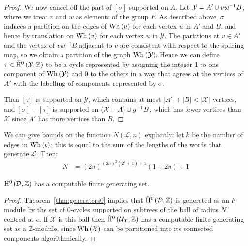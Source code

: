 \begin{proof}
We now cancel off the part of $\left[\sigma\right]$ supported on $A$.  Let
$\mathcal{Y} = A' \cup vw^{-1} B$, where we treat $v$ and $w$ as
elements of the group $F$. As described above, $\sigma$ induces a partition
on the edges of $\mathrm{Wh}\left(u\right)$ for each vertex $u$ in $A'$ and $B$, and hence
by translation on $\mathrm{Wh}\left(u\right)$ for each vertex $u$ in $\mathcal{Y}$. The
partitions at $v \in A'$ and the vertex of $vw^{-1}B$ adjacent to $v$ are
consistent with respect to the splicing map, so we obtain a partition of the
graph $\mathrm{Wh}\left(\mathcal{Y}\right)$. Hence we can define $\tau \in
\check{\mathrm{H}}^{0}\left(\mathcal{Y}, \mathbb{Z}\right)$ to be a cycle represented by
assigning the integer 1 to one component of $\mathrm{Wh}\left(\mathcal{Y}\right)$ and 0 to the
others in a way that agrees at the vertices of $A'$ with the labelling of
components represented by $\sigma$.

Then $\left[\tau\right]$ is supported on $\mathcal{Y}$, which contains at
most $\left|A'\right| + \left|B\right| < \left|\mathcal{X}\right|$ vertices,
and $\left[\sigma\right]-\left[\tau\right]$ is supported on $\left(
\mathcal{X} - A\right) \cup g^{-1}B$, which has fewer vertices than
$\mathcal{X}$ since $A'$ has more vertices than $B$. \end{proof}

\begin{rem} We can give bounds on the function $N\left(\mathcal{L}, n\right)$
explicitly: let $k$ be the number of edges in $\mathrm{Wh}\left(e\right)$; this is equal to
the sum of the lengths of the words that generate $\mathcal{L}$. Then:
\begin{align}
N &= \left(2n\right)^{\left(2n\right)^2\left(2^k+1\right)+1}\left(1+2n\right)+1
\end{align}
\end{rem}

\begin{cor} $\check{\mathrm{H}}{}^0\left(\mathcal{D}, \mathbb{Z}\right)$ has a computable
finite generating set.\end{cor}

\begin{proof} Theorem~\ref{thm:generators0} implies that $\check{\mathrm{H}}{}^0\left(
\mathcal{D}, \mathbb{Z} \right)$ is generated as an $F$-module by the set of
0-cycles supported on subtrees of the ball of radius $N$ centred at $e$.
If $\mathcal{X}$ is this ball then $\check{\mathrm{H}}{}^0\left(\mathcal{U}_\mathcal{X},
\mathbb{Z}\right)$ has a computable finite generating set as a
$\mathbb{Z}$-module, since $\mathrm{Wh}\left(\mathcal{X}\right)$ can be partitioned into
its connected components algorithmically.\end{proof}

